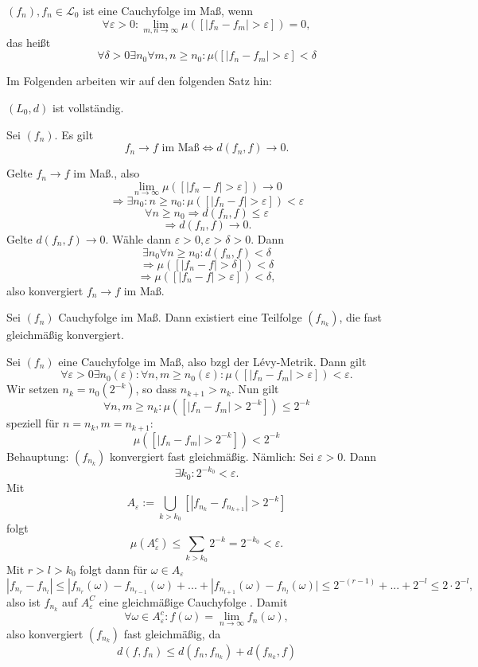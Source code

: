 			\begin{defi}
				$(f_n), f_n\in\mathcal{L}_0$ ist eine Cauchyfolge im Maß, wenn 
				\[ \forall\varepsilon>0: \lim_{m,n\to\infty}\mu([|f_n-f_m|>\varepsilon])=0, \]
				das heißt
				\[ \forall \delta>0\exists n_0\forall m,n\ge n_0: \mu([|f_n-f_m|>\varepsilon]<\delta \]
			\end{defi}
			
			Im Folgenden arbeiten wir auf den folgenden Satz hin:
			\begin{satz}
				$(L_0,d)$ ist vollständig. 
			\end{satz}
			
			\begin{satz}
				Sei $(f_n)$. Es gilt
				\[ f_n\to f\text{ im Maß}\Leftrightarrow d(f_n,f)\to 0. \]
			\end{satz}
			
			\begin{bew}
				Gelte $f_n\to f$ im Maß., also
				\[ \lim_{n\to\infty} \mu([|f_n-f|>\varepsilon])\to 0 \]
				\[ \Rightarrow \exists n_0: n\ge n_0: \mu([|f_n-f|>\varepsilon])<\varepsilon \]
				\[ \forall n\ge n_0\Rightarrow d(f_n,f)\le \varepsilon \]
				\[ \Rightarrow d(f_n,f)\to 0. \]
				Gelte $d(f_n,f)\to 0$. Wähle dann $\varepsilon>0, \varepsilon>\delta>0$.  Dann 
				\[ \exists n_0\forall n\ge n_0: d(f_n,f)<\delta  \]
				\[ \Rightarrow \mu([|f_n-f|>\delta])<\delta \]
				\[ \Rightarrow \mu([|f_n-f|>\varepsilon])<\delta, \]
				also konvergiert $f_n\to f$ im Maß. 
			\end{bew}
			
			\begin{satz}
				Sei $(f_n)$ Cauchyfolge im Maß. Dann existiert eine Teilfolge $(f_{n_k})$, die fast gleichmäßig konvergiert. 
			\end{satz}
			
			\begin{bew}
				Sei $(f_n)$ eine Cauchyfolge im Maß, also bzgl der Lévy-Metrik. Dann gilt
				\[ \forall \varepsilon>0\exists n_0(\varepsilon): \forall n,m\ge n_0(\varepsilon): \mu([|f_n-f_m|>\varepsilon])<\varepsilon. \]
				Wir setzen $n_k=n_0(2^{-k})$, so dass $n_{k+1}>n_k$. Nun gilt
				\[ \forall n,m\ge n_k: \mu([|f_n-f_m|>2^{-k}])\le 2^{-k} \]
				speziell für $n=n_k, m=n_{k+1}$:
				\[ \mu([|f_n-f_m|>2^{-k}])<2^{-k} \]
				Behauptung: $(f_{n_k})$ konvergiert fast gleichmäßig. Nämlich: Sei $\varepsilon>0$. Dann
				\[ \exists k_0: 2^{-k_0}<\varepsilon. \]
				Mit 
				\[ A_\varepsilon:=\bigcup_{k>k_0}[|f_{n_k}-f_{n_{k+1}}|>2^{-k}] \]
				folgt
				\[ \mu(A_\varepsilon^c)\le \sum_{k>k_0} 2^{-k}=2^{-k_0}<\varepsilon. \]
				Mit $r>l>k_0$ folgt dann für $\omega\in A_\varepsilon$
				\[ |f_{n_r}-f_{n_l}|\le |f_{n_r}(\omega)-f_{n_{r-1}}(\omega)+...+|f_{n_{l+1}}(\omega)-f_{n_l}(\omega)|\le 2^{-(r-1)}+...+2^{-l}\le 2\cdot 2^{-l}, \]
				also ist $f_{n_k}$ auf $A_\varepsilon^C$ eine gleichmäßige Cauchyfolge . Damit
				\[ \forall \omega\in A_\varepsilon^c:f(\omega)=\lim_{n\to\infty} f_n(\omega), \]
				also konvergiert  $(f_{n_k})$ fast gleichmäßig, da
				\[ d(f,f_n)\le d(f_n,f_{n_k})+d(f_{n_k},f) \]
			\end{bew}
			
